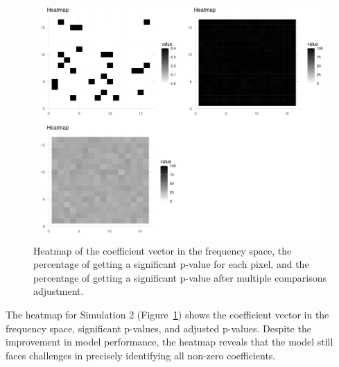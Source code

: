 \documentclass[12pt]{article}
\begin{document}
\begin{figure}[H]
    \centering
    \includegraphics[width=\textwidth]{../Figures/sim2_heatmap.png}
    \caption{Heatmap of the coefficient vector in the frequency space, the percentage of getting a significant p-value for each pixel, and the percentage of getting a significant p-value after multiple comparisons adjustment.}
    \label{fig:sim2_heatmap}
\end{figure}

The heatmap for Simulation 2 (Figure~\ref{fig:sim2_heatmap}) shows the coefficient vector in the frequency space, significant p-values, and adjusted p-values. Despite the improvement in model performance, the heatmap reveals that the model still faces challenges in precisely identifying all non-zero coefficients.
\end{document}
